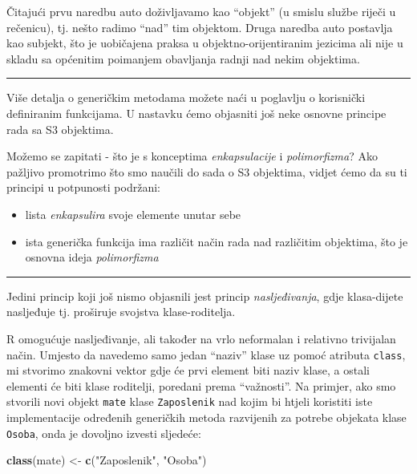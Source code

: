 \documentclass[]{book}
\newenvironment{Shaded}{\begin{snugshade}}{\end{snugshade}}
\newcommand{\KeywordTok}[1]{\textcolor[rgb]{0.13,0.29,0.53}{\textbf{#1}}}
\newcommand{\StringTok}[1]{\textcolor[rgb]{0.31,0.60,0.02}{#1}}
\newcommand{\NormalTok}[1]{#1}
\providecommand{\tightlist}{%
  \setlength{\itemsep}{0pt}\setlength{\parskip}{0pt}}
\theoremstyle{definition}
\theoremstyle{definition}
\theoremstyle{definition}
\theoremstyle{remark}
\begin{document}
Čitajući prvu naredbu auto doživljavamo kao ``objekt'' (u smislu službe
riječi u rečenicu), tj. nešto radimo ``nad'' tim objektom. Druga naredba
auto postavlja kao subjekt, što je uobičajena praksa u
objektno-orijentiranim jezicima ali nije u skladu sa općenitim poimanjem
obavljanja radnji nad nekim objektima.

\begin{center}\rule{0.5\linewidth}{\linethickness}\end{center}

Više detalja o generičkim metodama možete naći u poglavlju o korisnički
definiranim funkcijama. U nastavku ćemo objasniti još neke osnovne
principe rada sa S3 objektima.

Možemo se zapitati - što je s konceptima \emph{enkapsulacije} i
\emph{polimorfizma}? Ako pažljivo promotrimo što smo naučili do sada o
S3 objektima, vidjet ćemo da su ti principi u potpunosti podržani:

\begin{itemize}
\tightlist
\item
  lista \emph{enkapsulira} svoje elemente unutar sebe
\item
  ista generička funkcija ima različit način rada nad različitim
  objektima, što je osnovna ideja \emph{polimorfizma}
\end{itemize}

\begin{center}\rule{0.5\linewidth}{\linethickness}\end{center}

Jedini princip koji još nismo objasnili jest princip
\emph{nasljeđivanja}, gdje klasa-dijete nasljeđuje tj. proširuje
svojstva klase-roditelja.

R omogućuje nasljeđivanje, ali također na vrlo neformalan i relativno
trivijalan način. Umjesto da navedemo samo jedan ``naziv'' klase uz
pomoć atributa \texttt{class}, mi stvorimo znakovni vektor gdje će prvi
element biti naziv klase, a ostali elementi će biti klase roditelji,
poredani prema ``važnosti''. Na primjer, ako smo stvorili novi objekt
\texttt{mate} klase \texttt{Zaposlenik} nad kojim bi htjeli koristiti
iste implementacije određenih generičkih metoda razvijenih za potrebe
objekata klase \texttt{Osoba}, onda je dovoljno izvesti sljedeće:

\begin{Shaded}
\begin{Highlighting}[]
\KeywordTok{class}\NormalTok{(mate) <-}\StringTok{ }\KeywordTok{c}\NormalTok{(}\StringTok{"Zaposlenik"}\NormalTok{, }\StringTok{"Osoba"}\NormalTok{)}
\end{Highlighting}
\end{Shaded}
\end{document}
